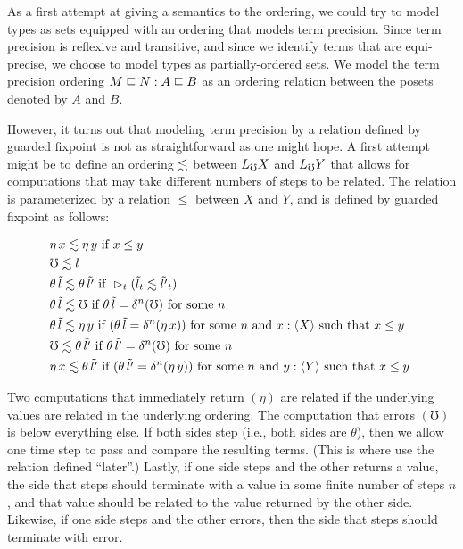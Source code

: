 As a first attempt at giving a semantics to the ordering, we could try to model types as
sets equipped with an ordering that models term precision. Since term precision is reflexive
and transitive, and since we identify terms that are equi-precise, we choose to model types
as partially-ordered sets. We model the term precision ordering $M \sqsubseteq N : A \sqsubseteq B$ as an
ordering relation between the posets denoted by $A$ and $B$.

However, it turns out that modeling term precision by a relation defined by guarded fixpoint
is not as straightforward as one might hope.
A first attempt might be to define an ordering $\lesssim$ between $L_\mho X$ and $L_\mho Y$
that allows for computations that may take different numbers of steps to be related.
The relation is parameterized by a relation $\le$ between $X$ and $Y$, and is defined
by guarded fixpoint as follows:

\begin{align*}
  &\eta\, x \semltbad \eta\, y \text{ if } 
    x \semlt y \\
%		
  &\mho \semltbad l \\
%
  &\theta\, \tilde{l} \semltbad \theta\, \tilde{l'} \text{ if } 
    \later_t (\tilde{l}_t \semltbad \tilde{l'}_t) \\
%	
  &\theta\, \tilde{l} \semltbad \mho \text{ if } 
    \theta\, \tilde{l} = \delta^n(\mho) \text { for some $n$ } \\
%	
  &\theta\, \tilde{l} \semltbad \eta\, y \text{ if }
    (\theta\, \tilde{l} = \delta^n(\eta\, x))
  \text { for some $n$ and $x : \ty{X}$ such that $x \le y$ } \\
%
  &\mho \semltbad \theta\, \tilde{l'} \text { if } 
    \theta\, \tilde{l'} = \delta^n(\mho) \text { for some $n$ } \\
%	
  &\eta\, x \semltbad \theta\, \tilde{l'} \text { if }
    (\theta\, \tilde{l'} = \delta^n (\eta\, y))
  \text { for some $n$ and $y : \ty{Y}$ such that $x \le y$ }
\end{align*}

Two computations that immediately return $(\eta)$ are related if the underlying
values are related in the underlying ordering. 
%
The computation that errors $(\mho)$ is below everything else.
%
If both sides step (i.e., both sides are $\theta$),
then we allow one time step to pass and compare the resulting terms.
(This is where use the relation defined ``later''.)
%
Lastly, if one side steps and the other returns a value, the side that steps should
terminate with a value in some finite number of steps $n$, and that value should
be related to the value returned by the other side.
Likewise, if one side steps and the other errors, then the side that steps
should terminate with error.

